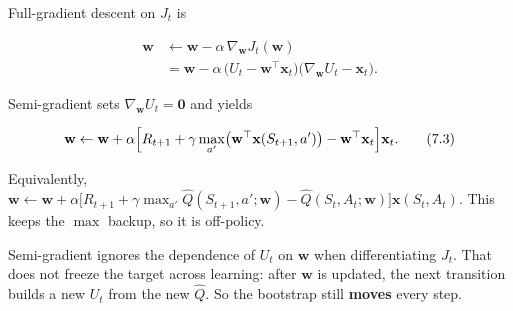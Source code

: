 Full-gradient descent on $J_t$ is

\[
\begin{aligned}
\mathbf{w}
&\leftarrow
\mathbf{w}
-
\alpha\,\nabla_{\mathbf{w}} J_t(\mathbf{w})
\\
&=
\mathbf{w}
-
\alpha\,
\bigl(U_t-\mathbf{w}^\top\mathbf{x}_t\bigr)
\bigl(\nabla_{\mathbf{w}} U_t-\mathbf{x}_t\bigr).
\end{aligned}
\]

Semi-gradient sets $\nabla_{\mathbf{w}} U_t=\mathbf{0}$ and yields

\begin{equation}
\mathbf{w}
\leftarrow
\mathbf{w}
+
\alpha
\Bigl[
R_{t+1}
+
\gamma\max_{a'}\bigl(\mathbf{w}^\top\mathbf{x}(S_{t+1},a')\bigr)
-
\mathbf{w}^\top\mathbf{x}_t
\Bigr]
\mathbf{x}_t.
\tag{7.3}
\end{equation}

Equivalently, $\mathbf{w}\leftarrow\mathbf{w}+\alpha\bigl[R_{t+1}+\gamma\max_{a'}\hat{Q}(S_{t+1},a';\mathbf{w})-\hat{Q}(S_t,A_t;\mathbf{w})\bigr]\mathbf{x}(S_t,A_t)$. This keeps the $\max$ backup, so it is off-policy.

Semi-gradient ignores the dependence of $U_t$ on $\mathbf{w}$ when differentiating $J_t$. That does not freeze the target across learning: after $\mathbf{w}$ is updated, the next transition builds a new $U_t$ from the new $\hat{Q}$. So the bootstrap still \textbf{moves} every step.

